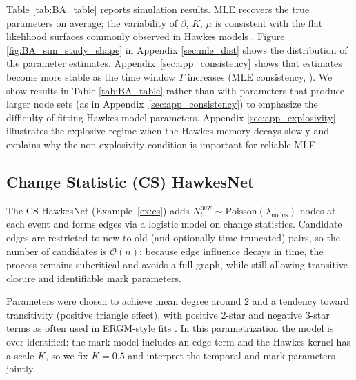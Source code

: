 \documentclass[12pt]{article}
\begin{document}
Table \ref{tab:BA_table} reports simulation results. MLE recovers the true parameters on average; the variability of $\beta$, $K$, $\mu$ is consistent with the flat likelihood surfaces commonly observed in Hawkes models \citep{schoenberg_density_trick,kresin2023parametric}. Figure \ref{fig:BA_sim_study_shape} in Appendix \ref{sec:mle_dist} shows the distribution of the parameter estimates. Appendix~\ref{sec:app_consistency} shows that estimates become more stable as the time window $T$ increases (MLE consistency, \citealt{rathbun1996}). We show results in Table \ref{tab:BA_table} rather than with parameters that produce larger node sets (as in Appendix~\ref{sec:app_consistency})  to emphasize the difficulty of fitting Hawkes model parameters.  Appendix \ref{sec:app_explosivity} illustrates the explosive regime when the Hawkes memory decays slowly and explains why the non-explosivity condition is important for reliable MLE. 

\subsection{Change Statistic (CS) HawkesNet}\label{sec:CS_sim}

The CS HawkesNet (Example~\ref{ex:cs}) adds $N_t^{\text{new}} \sim \text{Poisson}(\lambda_{\text{nodes}})$ nodes at each event and forms edges via a logistic model on change statistics. Candidate edges are restricted to new-to-old (and optionally time-truncated) pairs, so the number of candidates is $\mathcal{O}(n)$; because edge influence decays in time, the process remains subcritical and avoids a full graph, while still allowing transitive closure and identifiable mark parameters.

Parameters were chosen to achieve mean degree around $2$ and a tendency toward transitivity (positive triangle effect), with positive 2-star and negative 3-star terms as often used in ERGM-style fits \citep{Fellows2018,snijders2006}. In this parametrization the model is over-identified: the mark model includes an edge term and the Hawkes kernel has a scale $K$, so we fix $K = 0.5$ and interpret the temporal and mark parameters jointly.
\end{document}
